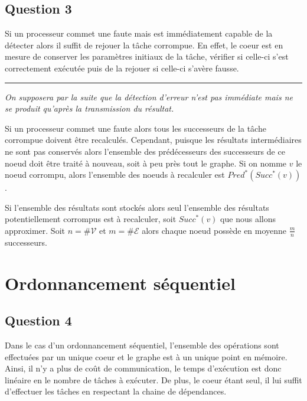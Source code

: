 \documentclass[11pt]{article}
\begin{document}

  \subsection{Question 3}
    Si un processeur commet une faute mais est immédiatement capable de la
    détecter alors il suffit de rejouer la tâche corrompue. En effet, le
    coeur est en mesure de conserver les paramètres initiaux de la tâche,
    vérifier si celle-ci s'est correctement exécutée puis de la rejouer si
    celle-ci s'avère fausse.

    \begin{center}
      \rule{0.5\linewidth}{0.1mm}

      \emph{On supposera par la suite que la détection d'erreur n'est pas
      immédiate mais ne se produit qu'après la transmission du résultat.}
    \end{center}

    Si un processeur commet une faute alors tous les successeurs de la tâche
    corrompue doivent être recalculés. Cependant, puisque les résultats
    intermédiaires ne sont pas conservés alors l'ensemble des prédécesseurs des
    successeurs de ce noeud doit être traité à nouveau, soit à peu près tout le
    graphe.  Si on nomme $v$ le noeud corrompu, alors l'ensemble des noeuds à
    recalculer est $Pred^{*}(Succ^{*}(v))$.

    Si l'ensemble des résultats sont stockés alors seul l'ensemble des résultats
    potentiellement corrompus est à recalculer, soit $Succ^{*}(v)$ que nous
    allons approximer.
    Soit $n = \#\mathcal{V}$ et $m = \#\mathcal{E}$ alors chaque noeud possède
    en moyenne $\frac{m}{n}$ successeurs.

\section{Ordonnancement séquentiel}
  \subsection{Question 4}
    Dans le cas d'un ordonnancement séquentiel, l'ensemble des opérations sont
    effectuées par un unique coeur et le graphe est à un unique point en
    mémoire. Ainsi, il n'y a plus de coût de communication, le temps d'exécution
    est donc linéaire en le nombre de tâches à exécuter. De plus, le coeur étant
    seul, il lui suffit d'effectuer les tâches en respectant la chaine de
    dépendances.
\end{document}
